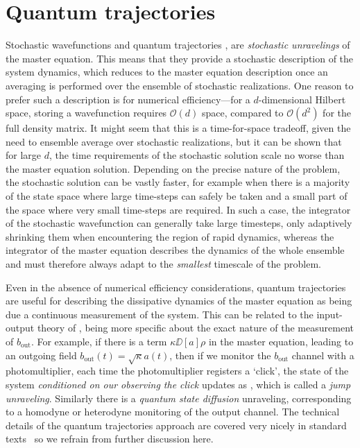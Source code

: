 \section{Quantum trajectories}\label{sec:trajectories}
Stochastic wavefunctions \cite{dum_monte_1992, dalibard_wave-function_1992, barchielli_measurements_1991} and quantum trajectories \cite{carmichael_open_1993}, are \emph{stochastic unravelings} of the master equation. This means that they provide a stochastic description of the system dynamics, which reduces to the master equation description once an averaging is performed over the ensemble of stochastic realizations. One reason to prefer such a description is for numerical efficiency---for a $d$-dimensional Hilbert space, storing a wavefunction requires $\mathcal{O}(d)$ space, compared to $\mathcal{O}(d^2)$ for the full density matrix. It might seem  that this is a time-for-space tradeoff, given the need to ensemble average over stochastic realizations, but it can be shown \cite{breuer_stochastic_1997} that for large $d$, the time requirements of the stochastic solution scale no worse than the master equation solution. Depending on the precise nature of the problem, the stochastic solution can be vastly faster, for example when there is a majority of the state space where large time-steps can safely be taken and a small part of the space where very small time-steps are required. In such a case, the integrator of the stochastic wavefunction can generally take large timesteps, only adaptively shrinking them when encountering the region of rapid dynamics, whereas the integrator of the master equation describes the dynamics of the whole ensemble and must therefore always adapt to the \emph{smallest} timescale of the problem.

Even in the absence of numerical efficiency considerations, quantum trajectories are useful for describing the dissipative dynamics of the master equation as being due a continuous measurement of the system. This can be related to the input-output theory of , being more specific about the exact nature of the measurement of $b_\text{out}$. For example, if there is a term $\kappa \DD[a]\rho$ in the master equation, leading to an outgoing field $b_\text{out}(t)=\sqrt{\kappa}a(t)$, then if we monitor the $b_\text{out}$ channel with a photomultiplier, each time the photomultiplier registers a `click', the state of the system \emph{conditioned on our observing the click} updates as
\be\label{eq:jump}
    \rho\mapsto {} ,
\ee
which is called a \emph{jump unraveling}. Similarly there is a \emph{quantum state diffusion} unraveling, corresponding to a homodyne or heterodyne monitoring of the output channel. The technical details of the quantum trajectories approach are covered very nicely in standard texts~\cite{hornberger_decoherence_2009, breuer_petruccione} so we refrain from further discussion here.

